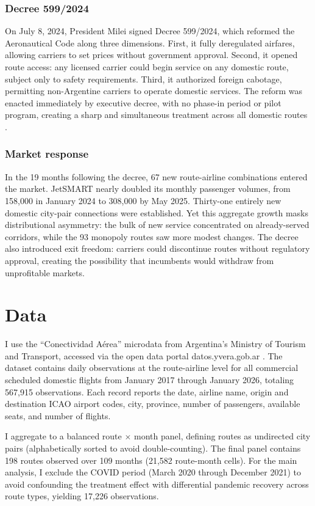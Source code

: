 \documentclass[12pt]{article}
\begin{document}
\subsubsection*{Decree 599/2024} On July 8, 2024, President Milei signed Decree 599/2024, which reformed the Aeronautical Code along three dimensions. First, it fully deregulated airfares, allowing carriers to set prices without government approval. Second, it opened route access: any licensed carrier could begin service on any domestic route, subject only to safety requirements. Third, it authorized foreign cabotage, permitting non-Argentine carriers to operate domestic services. The reform was enacted immediately by executive decree, with no phase-in period or pilot program, creating a sharp and simultaneous treatment across all domestic routes \citep{decreto599}.

\subsubsection*{Market response} In the 19 months following the decree, 67 new route-airline combinations entered the market. JetSMART nearly doubled its monthly passenger volumes, from 158,000 in January 2024 to 308,000 by May 2025. Thirty-one entirely new domestic city-pair connections were established. Yet this aggregate growth masks distributional asymmetry: the bulk of new service concentrated on already-served corridors, while the 93 monopoly routes saw more modest changes. The decree also introduced exit freedom: carriers could discontinue routes without regulatory approval, creating the possibility that incumbents would withdraw from unprofitable markets.


\section{Data}

I use the ``Conectividad A\'{e}rea'' microdata from Argentina's Ministry of Tourism and Transport, accessed via the open data portal datos.yvera.gob.ar \citep{anac2026}. The dataset contains daily observations at the route-airline level for all commercial scheduled domestic flights from January 2017 through January 2026, totaling 567,915 observations. Each record reports the date, airline name, origin and destination ICAO airport codes, city, province, number of passengers, available seats, and number of flights.

I aggregate to a balanced route $\times$ month panel, defining routes as undirected city pairs (alphabetically sorted to avoid double-counting). The final panel contains 198 routes observed over 109 months (21,582 route-month cells). For the main analysis, I exclude the COVID period (March 2020 through December 2021) to avoid confounding the treatment effect with differential pandemic recovery across route types, yielding 17,226 observations.
\end{document}
